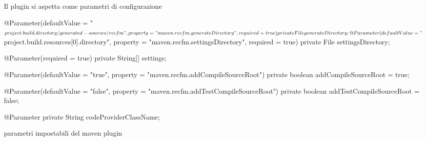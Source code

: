 \documentclass[a4paper,10pt]{report}
\newif\ifesource
\newenvironment{elisting}[1][H]
  {\captionsetup{aboveskip=0pt}\begin{listing}[#1]}
  {\end{listing}%
}
\begin{document}
Il plugin si aspetta come parametri di configurazione
\ifesource
\begin{figure*}[!htb]
\begin{lstlisting}[language=java, caption=parametri impostabili del maven plugin, 
label=lst:spring-conf]
    @Parameter(defaultValue = "${project.build.directory}/generated-sources/recfm",
        property = "maven.recfm.generateDirectory", required = true)
    private File generateDirectory;

    @Parameter(defaultValue = "${project.build.resources[0].directory}",
        property = "maven.recfm.settingsDirectory", required = true)
    private File settingsDirectory;
    
    @Parameter(required = true)
    private String[] settings;

    @Parameter(defaultValue = "true", property = "maven.recfm.addCompileSourceRoot")
    private boolean addCompileSourceRoot = true;

    @Parameter(defaultValue = "false", property = "maven.recfm.addTestCompileSourceRoot")
    private boolean addTestCompileSourceRoot = false;
    
    @Parameter
    private String codeProviderClassName;
\end{lstlisting}
\end{figure*}
\else
\begin{elisting}[!htb]
\begin{javacode}
    @Parameter(defaultValue = "${project.build.directory}/generated-sources/recfm",
        property = "maven.recfm.generateDirectory", required = true)
    private File generateDirectory;

    @Parameter(defaultValue = "${project.build.resources[0].directory}",
        property = "maven.recfm.settingsDirectory", required = true)
    private File settingsDirectory;
    
    @Parameter(required = true)
    private String[] settings;

    @Parameter(defaultValue = "true", property = "maven.recfm.addCompileSourceRoot")
    private boolean addCompileSourceRoot = true;

    @Parameter(defaultValue = "false", property = "maven.recfm.addTestCompileSourceRoot")
    private boolean addTestCompileSourceRoot = false;
    
    @Parameter
    private String codeProviderClassName;
\end{javacode}
\caption{parametri impostabili del maven plugin}
\label{lst:spring-conf}
\end{elisting}
\fi
\end{document}
